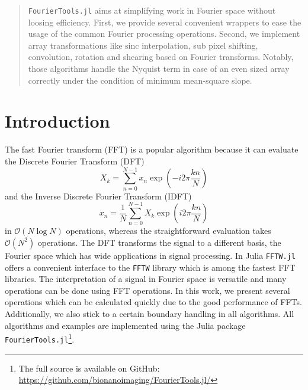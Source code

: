\documentclass{juliacon}
\def\sinc{\mathrm{sinc}}
\begin{document}


\maketitle

\begin{abstract}
\verb|FourierTools.jl| aims at simplifying work in Fourier
space without loosing efficiency.
First, we provide several convenient wrappers to ease the usage of the common Fourier processing operations.
Second, we implement array transformations like $\sinc$ interpolation, sub pixel shifting, convolution, rotation and shearing based on Fourier transforms.
Notably, those algorithms handle the Nyquist term in case of an even sized array correctly
under the condition of minimum mean-square slope.

\end{abstract}

\section{Introduction}
The fast Fourier transform (FFT) is a popular algorithm because it can evaluate the Discrete Fourier Transform (DFT) 
\begin{equation}
    X_k = \sum_{n=0}^{N-1} x_n \exp\left(-i2 \pi \frac{kn}{N} \right)
    \label{eq:dft}
\end{equation}
and the Inverse Discrete Fourier Transform (IDFT)
\begin{equation}
    x_n = \frac1{N}\sum_{n=0}^{N-1} X_k \exp\left(i2 \pi \frac{kn}{N} \right)
    \label{eq:idft}
\end{equation}
in $\mathcal{O}(N \log N)$ operations, whereas the straightforward
evaluation takes $\mathcal{O}(N^2)$ operations.
The DFT transforms the signal to a different basis, the Fourier space which
has wide applications in signal processing.
In Julia \cite{bezanson2017julia} \verb|FFTW.jl| offers a convenient interface to
the \verb|FFTW| library \cite{FFTW05} which is among the fastest FFT libraries.
The interpretation of a signal in Fourier space is versatile and many operations can
be done using FFT operations. 
In this work, we present several operations which can be calculated quickly 
due to the good performance of FFTs.
Additionally, we also stick to a certain boundary handling in all algorithms.
All algorithms and examples are implemented using the Julia package \verb|FourierTools.jl|\footnote{The full source is available on GitHub: \url{https://github.com/bionanoimaging/FourierTools.jl/}}.
\end{document}
